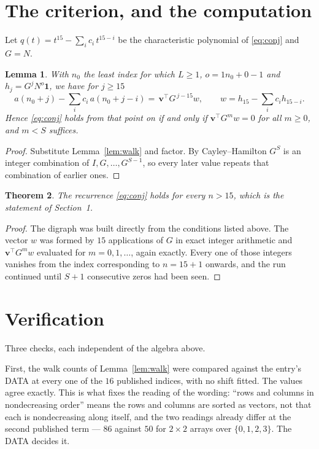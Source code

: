 \documentclass[11pt,a4paper]{article}
\theoremstyle{plain}
\newtheorem{theorem}{Theorem}
\newtheorem{lemma}[theorem]{Lemma}
\theoremstyle{definition}
\begin{document}
\section{The criterion, and the computation}

Let $q(t)=t^{15}-\sum_i c_i\,t^{15-i}$ be the characteristic polynomial of
\eqref{eq:conj} and $G=N$.

\begin{lemma}\label{lem:crit}
With $n_0$ the least index for which $L\ge1$, $o=1n_0+0-1$ and
$h_j=G^{j}N^{o}\mathbf{1}$, we have for $j\ge15$
\[
a(n_0+j)-\sum_i c_i\,a(n_0+j-i)=\,\mathbf{v}^{\!\top}G^{\,j-15}w,
\qquad w=h_{15}-\sum_i c_ih_{15-i} .
\]
Hence \eqref{eq:conj} holds from that point on if and only if
$\mathbf{v}^{\!\top}G^{m}w=0$ for all $m\ge0$, and $m<S$ suffices.
\end{lemma}

\begin{proof}
Substitute Lemma~\ref{lem:walk} and factor. By Cayley--Hamilton $G^{S}$ is an integer
combination of $I,G,\dots,G^{S-1}$, so every later value repeats that combination of
earlier ones.
\end{proof}

\begin{theorem}
The recurrence \eqref{eq:conj} holds for every $n>15$, which is the statement of
Section~1.
\end{theorem}

\begin{proof}
The digraph was built directly from the conditions listed above. The vector $w$ was formed by
$15$ applications of $G$ in exact integer arithmetic and $\mathbf{v}^{\!\top}G^{m}w$
evaluated for $m=0,1,\dots$, again exactly. Every one of those integers vanishes from the
index corresponding to $n=15+1$ onwards, and the run continued until $S+1$ consecutive
zeros had been seen.
\end{proof}

\section{Verification}

Three checks, each independent of the algebra above.

First, the walk counts of Lemma~\ref{lem:walk} were compared against the entry's DATA at
every one of the $16$ published indices, with no shift fitted. The values agree exactly.
This is what fixes the reading of the wording: ``rows and columns in nondecreasing order''
means the rows and columns are sorted as vectors, not that each is nondecreasing along
itself, and the two readings already differ at the second published term --- $86$ against
$50$ for $2\times2$ arrays over $\{0,1,2,3\}$. The DATA decides it.
\end{document}

